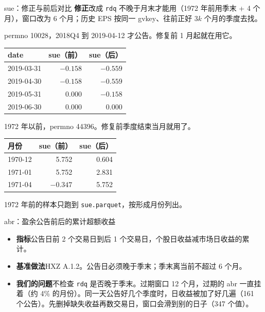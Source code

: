 \documentclass[UTF8,fontset=fandol,aspectratio=169,10pt,t]{ctexbeamer}
\newcommand{\chg}[1]{\textcolor{red!80!black}{#1}}
\newcommand{\code}[1]{\texttt{#1}}
\newcommand{\lab}[1]{\textbf{#1}\quad}
\newcommand{\tsize}{\small}
\newcommand{\src}[1]{{\footnotesize\color{black!60}#1}}
\begin{document}
\begin{frame}{sue：修正与前后对比}
\lab{修正}改成 \code{rdq} 不晚于月末才能用（1972 年前用季末 + 4 个月），窗口改为 6 个月；历史 EPS 按同一 gvkey、往前正好 $3k$ 个月的季度去找。\par\medskip
\begin{minipage}[t]{0.46\linewidth}
\src{permno 10028，2018Q4 到 2019-04-12 才公告。修复前 1 月起就在用它。}\par\smallskip
{\tsize
\begin{tabular}{l rr}
\toprule
date & sue（前） & sue（后） \\
\midrule
2019-03-31 & $-0.158$ & \chg{$-0.559$} \\
2019-04-30 & $-0.158$ & \chg{$-0.559$} \\
2019-05-31 & $0.000$ & \chg{$-0.158$} \\
2019-06-30 & $0.000$ & $0.000$ \\
\bottomrule
\end{tabular}}
\end{minipage}\hfill
\begin{minipage}[t]{0.46\linewidth}
\src{1972 年以前，permno 44396。修复前季度结束当月就用了。}\par\smallskip
{\tsize
\begin{tabular}{l rr}
\toprule
月份 & sue（前） & sue（后） \\
\midrule
1970-12 & 5.752 & \chg{0.604} \\
1971-01 & 5.752 & \chg{2.831} \\
1971-04 & $-0.347$ & \chg{5.752} \\
\bottomrule
\end{tabular}}
\par\medskip
\end{minipage}
\src{1972 年前的样本只跑到 \code{sue.parquet}，按形成月份列出。}
\end{frame}

\begin{frame}{abr：盈余公告前后的累计超额收益}
\begin{itemize}
\item \lab{指标}公告日前 2 个交易日到后 1 个交易日，个股日收益减市场日收益的累计。
\item \lab{基准做法}HXZ A.1.2。公告日必须晚于季末；季末离当前不超过 6 个月。
\item \lab{我们的问题}不检查 \code{rdq} 是否晚于季末。过期窗口 12 个月，过期的 abr 一直挂着（约 4\% 的月份）。同一天公告好几个季度时，日收益被加了好几遍（161 个公告）。先删掉缺失收益再数交易日，窗口会滑到别的日子（347 个值）。
\end{itemize}
\end{frame}
\end{document}

